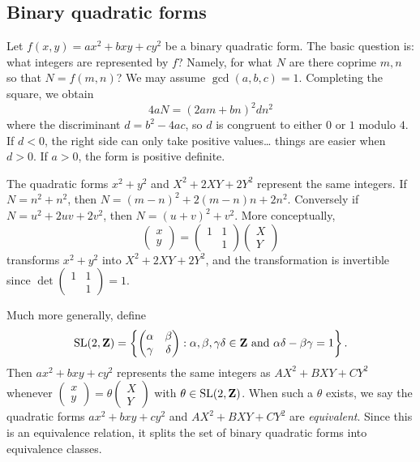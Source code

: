 \subsection{Binary quadratic forms}

Let $f(x,y)=a x^2 + b x y + c y^2$ be a binary quadratic form. The basic 
question is: what integers are represented by $f$? Namely, for what $N$ are 
there coprime $m,n$ so that $N=f(m,n)$? We may assume $\gcd(a,b,c)=1$. 
Completing the square, we obtain 
\[
  4 a N = (2 a m+b n)^2  d n^2
\]
where the discriminant $d=b^2 -4 a c$, so $d$ is congruent to either $0$ or 
$1$ modulo $4$. If $d<0$, the right side can only take positive values\ldots 
things are easier when $d>0$. If $a>0$, the form is positive definite. 

The quadratic forms $x^2+y^2$ and $X^2+2 X Y + 2 Y^2$ represent the same 
integers. If $N=n^2+n^2$, then $N = (m-n)^2 + 2 (m-n) n + 2 n^2$. Conversely if 
$N = u^2 + 2 u v + 2 v^2$, then $N=(u+v)^2+v^2$. More conceptually, 
\[
  \begin{pmatrix} x \\ y \end{pmatrix} = \begin{pmatrix} 1 & 1 \\ & 1 \end{pmatrix} \begin{pmatrix} X \\ Y \end{pmatrix}
\]
transforms $x^2+y^2$ into $X^2+2 X Y + 2 Y^2$, and the transformation is 
invertible since $\det\begin{pmatrix} 1 & 1 \\ & 1 \end{pmatrix} = 1$. 

Much more generally, define 
\[
  \operatorname{SL}(2,\mathbf{Z}) = \left\{\begin{pmatrix} \alpha & \beta \\ \gamma & \delta \end{pmatrix} : \alpha,\beta,\gamma\delta\in \mathbf{Z}\text{ and }\alpha\delta-\beta\gamma=1\right\} .
\]
Then $a x^2+b x y+c y^2$ represents the same integers as 
$A X^2 + B X Y + C Y^2$ whenever 
$\begin{pmatrix} x \\ y\end{pmatrix} = \theta \begin{pmatrix} X \\ Y\end{pmatrix}$ 
with $\theta\in \operatorname{SL}(2,\mathbf{Z})$. When such a $\theta$ exists, we say the 
quadratic forms $a x^2+b x y+c y^2$ and $A X^2+B X Y+C Y^2$ are 
\emph{equivalent}. Since this is an equivalence relation, it splits the set of 
binary quadratic forms into equivalence classes. 

